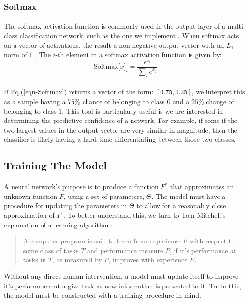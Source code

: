 \documentclass[12pt,letterpaper]{article}
\begin{document}

\subsubsection{Softmax}
\label{subsubsec-Softmax}

\paragraph*{}The softmax activation function is commonly used in the output layer of a multi-class classification network, such as the one we implement \cite{Geron,Loy}. When softmax acts on a vector of activations, the result a non-negative output vector with an $L_1$ norm of $1$ \cite{Geron,Goodfellow,Virtanen}. The $i$-th element in a softmax activation function is given by:
\begin{equation}
\label{eqn-Softmax}
\text{Softmax}\big[ x \big]_{i} = \frac{e^{x_i}}{\sum_{j}e^{x_j}}
\end{equation}

\paragraph*{}If Eq.(\ref{eqn-Softmax}) returns a vector of the form: $[ 0.75 , 0.25]$, we interpret this as a sample having a $75\%$ chance of belonging to class $0$ and a $25\%$ change of belonging to class $1$. This tool is particularly useful is we are interested in determining the predictive confidence of a network. For example, if some if the two largest values in the output vector are very similar in magnitude, then the classifier is likely having a hard time differentiating between those two classes.


\subsection{Training The Model}
\label{subsec-Training}

\paragraph*{}A neural network's purpose is to produce a function $F^*$ that approximates an unknown function $F$, using a set of parameters, $\Theta$. The model must have a procedure for updating the parameters in $\Theta$ to allow for a reasonably close approximation of $F$ \cite{Goodfellow}. To better understand this, we turn to Tom Mitchell's explanation of a learning algorithm \cite{Mitchell}:
\begin{quote}
A computer program is said to learn from experience $E$ with respect to some class of tasks $T$ and performance measure $P$, if it's performance at tasks in $T$, as measured by $P$, improves with experience $E$.
\end{quote}
Without any direct human intervention, a model must update itself to improve it's performance at a give task as new information is presented to it. To do this, the model must be constructed with a training procedure in mind. 
\end{document}
